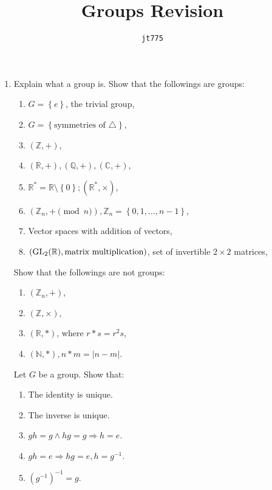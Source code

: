 \documentclass{article}
\title{\textbf{Groups Revision}}
\author{\texttt{jt775}}
\date{\null}
\newlength{\qspace}
\newcounter{qnumber}
\newenvironment{question}%
 {\vspace{\qspace}
  \begin{enumerate}[\bfseries 1\quad][10]%
    \setcounter{enumi}{\value{qnumber}}%
    \item%
 }
{
  \end{enumerate}
  \filbreak
  \stepcounter{qnumber}
 }
\begin{document}
\maketitle
\vspace{-1.5cm}
\begin{question}
  Explain what a group is. Show that the followings are groups:

\begin{multicols}{2}
  \begin{enumerate}
    \item $G = \left\{ e\right\}$, the trivial group,
    \item $ G = \left\{ \text{symmetries of } \triangle \right\} $,
    \item $ (\mathbb{Z} , +) $,
    \item $ (\mathbb{R} ,+), (\mathbb{Q} , +), (\mathbb{C} , +) $,
    \item $ \mathbb{R}^* = \mathbb{R} \setminus \left\{ 0\right\}; (\mathbb{R}^*, \times) $,
    \item $ (\mathbb{Z}_n, + \pmod n), \mathbb{Z}_n = \left\{ 0,1,\dots, n-1\right\} $,
    \item Vector spaces with addition of vectors,
    \item $ (\rm{GL}_2(\mathbb{R}), \text{matrix multiplication}) $, set of invertible $2\times 2$ matrices,
\end{enumerate}
\end{multicols}

Show that the followings are not groups:

\begin{multicols}{2}
  \begin{enumerate}
    \item $ (\mathbb{Z}_n, +) $,
    \item $ (\mathbb{Z} , \times) $,
    \item $ (\mathbb{R} , *) $, where $ r*s = r^2 s $,
    \item $ (\mathbb{N}, *), n*m = |n-m| $.
  \end{enumerate}
\end{multicols}

Let $G$ be a group. Show that:

\begin{multicols}{3}
  \begin{enumerate}
    \item The identity is unique.
    \item The inverse is unique.
    \item $ gh=g \land hg=g \Rightarrow h=e $.
    \item $ gh=e \Rightarrow hg=e, h=g^{-1} $.
    \item $ (g^{-1})^{-1}=g $.
\end{enumerate}
\end{multicols}


\end{question}
\end{document}
